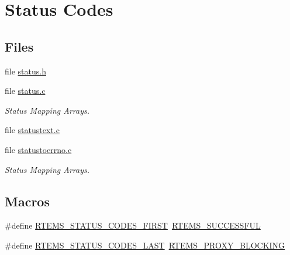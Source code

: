 \hypertarget{group__ClassicStatus}{}\section{Status Codes}
\label{group__ClassicStatus}
\subsection*{Files}
\begin{DoxyCompactItemize}
\item 
file \mbox{\hyperlink{rtems_2status_8h}{status.\+h}}
\item 
file \mbox{\hyperlink{status_8c}{status.\+c}}
\begin{DoxyCompactList}\small\item\em Status Mapping Arrays. \end{DoxyCompactList}\item 
file \mbox{\hyperlink{statustext_8c}{statustext.\+c}}
\item 
file \mbox{\hyperlink{statustoerrno_8c}{statustoerrno.\+c}}
\begin{DoxyCompactList}\small\item\em Status Mapping Arrays. \end{DoxyCompactList}\end{DoxyCompactItemize}
\subsection*{Macros}
\begin{DoxyCompactItemize}
\item 
\#define \mbox{\hyperlink{group__ClassicStatus_gacfe68f6d8aa7565fb918df4a816813c3}{R\+T\+E\+M\+S\+\_\+\+S\+T\+A\+T\+U\+S\+\_\+\+C\+O\+D\+E\+S\+\_\+\+F\+I\+R\+ST}}~\mbox{\hyperlink{group__ClassicStatus_gga545d41846817eaba6143d52ee4d9e9fea8a23e2d94778f09399da984d73562536}{R\+T\+E\+M\+S\+\_\+\+S\+U\+C\+C\+E\+S\+S\+F\+UL}}
\item 
\#define \mbox{\hyperlink{group__ClassicStatus_ga4affdaeaa9782b37d646cd918753cc12}{R\+T\+E\+M\+S\+\_\+\+S\+T\+A\+T\+U\+S\+\_\+\+C\+O\+D\+E\+S\+\_\+\+L\+A\+ST}}~\mbox{\hyperlink{group__ClassicStatus_gga545d41846817eaba6143d52ee4d9e9fea2456007f9975a9eea5387e21a4459ea8}{R\+T\+E\+M\+S\+\_\+\+P\+R\+O\+X\+Y\+\_\+\+B\+L\+O\+C\+K\+I\+NG}}
\end{DoxyCompactItemize}
